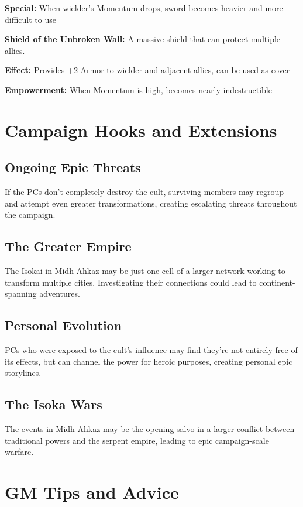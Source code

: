 \documentclass[12pt,twoside]{article}
\begin{document}
\textbf{Special:} When wielder's Momentum drops, sword becomes heavier and more difficult to use

\textbf{Shield of the Unbroken Wall:}
A massive shield that can protect multiple allies.

\textbf{Effect:} Provides +2 Armor to wielder and adjacent allies, can be used as cover

\textbf{Empowerment:} When Momentum is high, becomes nearly indestructible

\section{Campaign Hooks and Extensions}

\subsection{Ongoing Epic Threats}

If the PCs don't completely destroy the cult, surviving members may regroup and attempt even greater transformations, creating escalating threats throughout the campaign.

\subsection{The Greater Empire}

The Isokai in Midh Ahkaz may be just one cell of a larger network working to transform multiple cities. Investigating their connections could lead to continent-spanning adventures.

\subsection{Personal Evolution}

PCs who were exposed to the cult's influence may find they're not entirely free of its effects, but can channel the power for heroic purposes, creating personal epic storylines.

\subsection{The Isoka Wars}

The events in Midh Ahkaz may be the opening salvo in a larger conflict between traditional powers and the serpent empire, leading to epic campaign-scale warfare.

\section{GM Tips and Advice}
\end{document}
